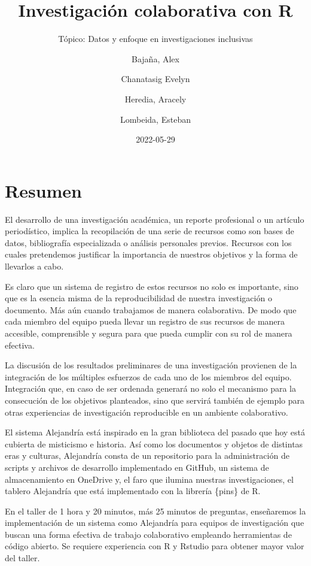 \documentclass[
]{article}
\title{Investigación colaborativa con R}
\subtitle{Tópico: Datos y enfoque en investigaciones inclusivas}
\author{Bajaña, Alex \and Chanatasig Evelyn \and Heredia,
Aracely \and Lombeida, Esteban}
\date{2022-05-29}
\begin{document}
\maketitle

{
\setcounter{tocdepth}{1}
\tableofcontents
}
\hypertarget{resumen}{%
\section{Resumen}\label{resumen}}

El desarrollo de una investigación académica, un reporte profesional o
un artículo periodístico, implica la recopilación de una serie de
recursos como son bases de datos, bibliografía especializada o análisis
personales previos. Recursos con los cuales pretendemos justificar la
importancia de nuestros objetivos y la forma de llevarlos a cabo.

Es claro que un sistema de registro de estos recursos no solo es
importante, sino que es la esencia misma de la reproducibilidad de
nuestra investigación o documento. Más aún cuando trabajamos de manera
colaborativa. De modo que cada miembro del equipo pueda llevar un
registro de sus recursos de manera accesible, comprensible y segura para
que pueda cumplir con su rol de manera efectiva.

La discusión de los resultados preliminares de una investigación
provienen de la integración de los múltiples esfuerzos de cada uno de
los miembros del equipo. Integración que, en caso de ser ordenada
generará no solo el mecanismo para la consecución de los objetivos
planteados, sino que servirá también de ejemplo para otras experiencias
de investigación reproducible en un ambiente colaborativo.

El sistema Alejandría está inspirado en la gran biblioteca del pasado
que hoy está cubierta de misticismo e historia. Así como los documentos
y objetos de distintas eras y culturas, Alejandría consta de un
repositorio para la administración de scripts y archivos de desarrollo
implementado en GitHub, un sistema de almacenamiento en OneDrive y, el
faro que ilumina nuestras investigaciones, el tablero Alejandría que
está implementado con la librería \{pins\} de R.

En el taller de 1 hora y 20 minutos, más 25 minutos de preguntas,
enseñaremos la implementación de un sistema como Alejandría para equipos
de investigación que buscan una forma efectiva de trabajo colaborativo
empleando herramientas de código abierto. Se requiere experiencia con R
y Rstudio para obtener mayor valor del taller.
\end{document}
